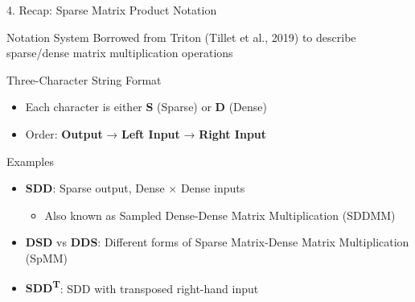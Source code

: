 \documentclass[11pt]{beamer}
\begin{document}
\begin{frame}[shrink]{4. Recap: Sparse Matrix Product Notation}
    \begin{block}{Notation System}
    \footnotesize
    Borrowed from Triton (Tillet et al., 2019) to describe sparse/dense matrix multiplication operations
    \end{block}
    
    \begin{block}{Three-Character String Format}
    \footnotesize
    \begin{itemize}
        \item Each character is either \textbf{S} (Sparse) or \textbf{D} (Dense)
        \item Order: \textbf{Output} → \textbf{Left Input} → \textbf{Right Input}
    \end{itemize}
    \end{block}
    
    \begin{block}{Examples}
    \footnotesize
    \begin{itemize}
        \item \textbf{SDD}: Sparse output, Dense × Dense inputs
        \begin{itemize}
            \item Also known as Sampled Dense-Dense Matrix Multiplication (SDDMM)
        \end{itemize}
        \item \textbf{DSD} vs \textbf{DDS}: Different forms of Sparse Matrix-Dense Matrix Multiplication (SpMM)
        \item \textbf{SDD\textsuperscript{T}}: SDD with transposed right-hand input
    \end{itemize}
    \end{block}
\end{frame}
\end{document}

